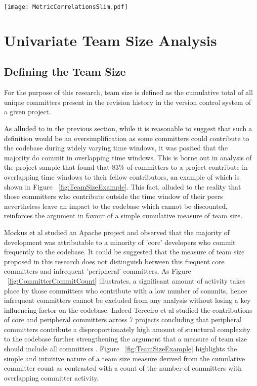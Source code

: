\begin{table}
\centering 
{}
\begin{tabular}
 \centering 
 \texttt{[image: MetricCorrelationsSlim.pdf]}
 \label{tab:MetricCorrelations}
\end{tabular}
\end{table}


\section{Univariate Team Size Analysis} %
\subsection{Defining the Team Size}
For the purpose of this research, team size is defined as the cumulative total of all unique committers present in the revision history in the version control system of a given project. 

As alluded to in the previous section, while it is reasonable to suggest that such a definition would be an oversimplification as some committers could contribute to the codebase during widely varying time windows, it was posited that the majority do commit in overlapping time windows. This is borne out in analysis of the project sample that found that 83\% of committers to a project contribute in overlapping time windows to their fellow contributors, an example of which is shown in Figure ~\ref{fig:TeamSizeExample}. This fact, alluded to the reality that those committers who contribute outside the time window of their peers nevertheless leave an impact to the codebase which cannot be discounted, reinforces the argument in favour of a simple cumulative measure of team size.

Mockus et al studied an Apache project and observed that the majority of development was attributable to a minority of 'core' developers \citep{mockus2000case} who commit frequently to the codebase. It could be suggested that the measure of team size proposed in this research does not distinguish between this frequent core committers and infrequent 'peripheral' committers. As Figure ~\ref{fig:CommitterCommitCount} illustrates, a significant amount of activity takes place by those committers who contribute with a low number of commits, hence infrequent committers cannot be excluded from any analysis without losing a key influencing factor on the codebase. Indeed Terceiro et al studied the contributions of core and peripheral committers across 7 projects concluding that peripheral committers contribute a disproportionately high amount of structural complexity to the codebase further strengthening the argument that a measure of team size should include all committers \citep{terceiro2010empirical}. Figure ~\ref{fig:TeamSizeExample} highlights the simple and intuitive nature of a team size measure derived from the cumulative committer count as contrasted with a count of the number of committers with overlapping committer activity.

